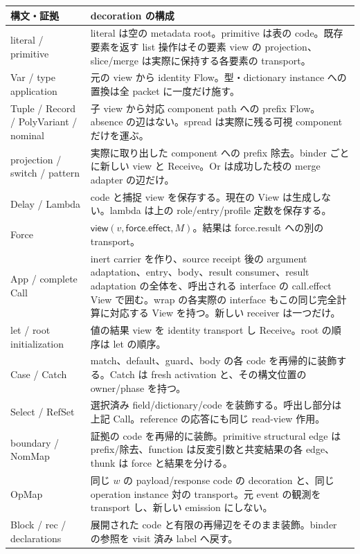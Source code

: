 \documentclass[11pt,a4paper]{article}
\newcommand{\View}{\mathsf{view}}
\begin{document}
\begin{longtable}{p{}p{}}
\toprule 構文・証拠 & decoration の構成 \\
\midrule\endhead
literal / primitive & literal は空の metadata root。primitive は表の code。既存要素を返す list 操作はその要素 view の projection、slice/merge は実際に保持する各要素の transport。\\
Var / type application & 元の view から identity Flow。型・dictionary instance への置換は全 packet に一度だけ施す。\\
Tuple / Record / PolyVariant / nominal & 子 view から対応 component path への prefix Flow。absence の辺はない。spread は実際に残る可視 component だけを運ぶ。\\
projection / switch / pattern & 実際に取り出した component への prefix 除去。binder ごとに新しい view と Receive。Or は成功した枝の merge adapter の辺だけ。\\
Delay / Lambda & code と捕捉 view を保存する。現在の View は生成しない。lambda は上の role/entry/profile 定数を保存する。\\
Force & \(\View(v,\mathsf{force.effect},M)\)。結果は force.result への別の transport。\\
App / complete Call & inert carrier を作り、source receipt 後の argument adaptation、entry、body、result consumer、result adaptation の全体を、呼出される interface の call.effect View で囲む。wrap の各実際の interface もこの同じ完全計算に対応する View を持つ。新しい receiver は一つだけ。\\
let / root initialization & 値の結果 view を identity transport し Receive。root の順序は let の順序。\\
Case / Catch & match、default、guard、body の各 code を再帰的に装飾する。Catch は fresh activation と、その構文位置の owner/phase を持つ。\\
Select / RefSet & 選択済み field/dictionary/code を装飾する。呼出し部分は上記 Call。reference の応答にも同じ read-view 作用。\\
boundary / NomMap & 証拠の code を再帰的に装飾。primitive structural edge は prefix/除去、function は反変引数と共変結果の各 edge、thunk は force と結果を分ける。\\
OpMap & 同じ \(w\) の payload/response code の decoration と、同じ operation instance 対の transport。元 event の観測を transport し、新しい emission にしない。\\
Block / rec / declarations & 展開された code と有限の再帰辺をそのまま装飾。binder の参照を visit 済み label へ戻す。\\
\bottomrule
\end{longtable}
\end{document}
